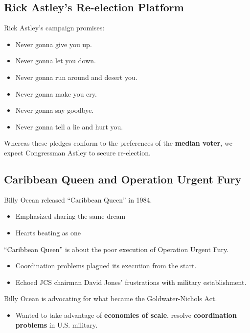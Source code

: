 \documentclass[11pt,]{article}
\providecommand{\tightlist}{%
\setlength{\itemsep}{0pt}\setlength{\parskip}{0pt}}
\begin{document}
\subsection{Rick Astley's Re-election
Platform}\label{rick-astleys-re-election-platform}

Rick Astley's campaign promises:

\begin{itemize}
\tightlist
\item
  Never gonna give you up.
\item
  Never gonna let you down.
\item
  Never gonna run around and desert you.
\item
  Never gonna make you cry.
\item
  Never gonna say goodbye.
\item
  Never gonna tell a lie and hurt you.
\end{itemize}

Whereas these pledges conform to the preferences of the \textbf{median
voter}, we expect Congressman Astley to secure re-election.

\subsection{Caribbean Queen and Operation Urgent
Fury}\label{caribbean-queen-and-operation-urgent-fury}

Billy Ocean released ``Caribbean Queen'' in 1984.

\begin{itemize}
\tightlist
\item
  Emphasized sharing the same dream
\item
  Hearts beating as one
\end{itemize}

``Caribbean Queen'' is about the poor execution of Operation Urgent
Fury.

\begin{itemize}
\tightlist
\item
  Coordination problems plagued its execution from the start.
\item
  Echoed JCS chairman David Jones' frustrations with military
  establishment.
\end{itemize}

Billy Ocean is advocating for what became the Goldwater-Nichols Act.

\begin{itemize}
\tightlist
\item
  Wanted to take advantage of \textbf{economies of scale}, resolve
  \textbf{coordination problems} in U.S. military.
\end{itemize}
\end{document}
